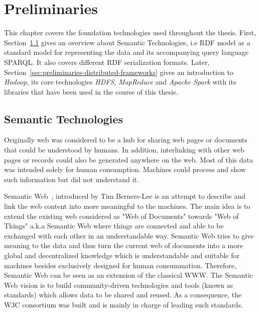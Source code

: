 \chapter{Preliminaries}
\label{chapter:preliminaries}
This chapter covers the foundation technologies used throughout the thesis.
First, Section~\ref{sec:preliminaries-semantic-technologies} gives an overview about Semantic Technologies, i.e \gls{RDF} model as a standard model for representing the data and its accompanying query language \gls{SPARQL}.
It also covers different \gls{RDF} serialization formats. 
Later, Section~\ref{sec:preliminaries-distributed-frameworks} gives an introduction to \textit{Hadoop}, its core technologies \textit{\gls{HDFS}}, \textit{MapReduce} and \textit{Apache Spark} with its libraries that have been used in the course of this thesis.

\section{Semantic Technologies}
\label{sec:preliminaries-semantic-technologies}
Originally web was considered to be a hub for sharing web pages or documents that could be understood by humans.
In addition, interlinking with other web pages or records could also be generated anywhere on the web. 
Most of this data was intended solely for human consumption.
Machines could process and show such information but did not understand it.

Semantic Web~\cite{bernerslee2001semantic}, introduced by Tim Berners-Lee is an attempt to describe and link the web content into more meaningful to the machines.
The main idea is to extend the existing web considered as "Web of Documents" towards "Web of Things" a.k.a Semantic Web where things are connected and able to be exchanged with each other in an understandable way.
Semantic Web tries to give meaning to the data and thus turn the current web of documents into a more global and decentralized knowledge which is understandable and suitable for machines besides exclusively designed for human consummation.
Therefore, Semantic Web can be seen as an extension of the classical \gls{WWW}.
The Semantic Web vision is to build community-driven technologies and tools (known as standards) which allows data to be shared and reused.
As a consequence, the \gls{W3C} consortium was built and is mainly in charge of leading such standards.


